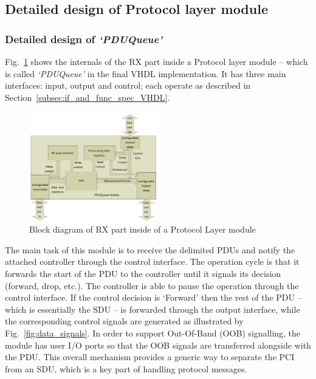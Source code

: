 \documentclass[journal]{IEEEtran}
\begin{document}
\subsection{Detailed design of Protocol layer module}

\subsubsection{Detailed design of \emph{`PDUQueue'}}\label{subsubsec:PDUQueue_details}

Fig.~\ref{fig:proto_layer_rx_sch} shows the internals of the RX part inside a Protocol layer module -- which is
called \emph{`PDUQueue'} in the final VHDL implementation. It has three main interfaces: input, output and control;
each operate as described in Section~\ref{subsec:if_and_func_spec_VHDL}.

\begin{figure}[!htb]
    \centering
    \includegraphics[width=0.5\textwidth]{figures_raw/pdu_queue_imp.pdf}
    \caption{Block diagram of RX part inside of a Protocol Layer module}
    \label{fig:proto_layer_rx_sch}
\end{figure}

The main task of this module is to receive the delimited PDUs and notify the attached controller through the control
interface. The operation cycle is that it forwards the start of the PDU to the controller until it signals its decision
(forward, drop, etc.). The controller is able to pause the operation through the control interface. If the control
decision is `Forward' then the rest of the PDU -- which is essentially the SDU -- is forwarded through the output
interface, while the corresponding control signals are generated as illustrated by Fig.~\ref{fig:data_signals}. In
order to support Out-Of-Band (OOB) signalling, the module has user I/O ports so that the OOB signals are transferred
alongside with the PDU. This overall mechanism provides a generic way to separate the PCI from an SDU, which is a key
part of handling protocol messages.
\end{document}
